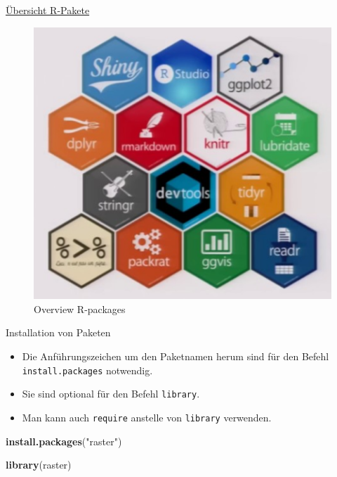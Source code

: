 \documentclass[ignorenonframetext,]{beamer}
\newenvironment{Shaded}{\begin{snugshade}}{\end{snugshade}}
\newcommand{\KeywordTok}[1]{\textcolor[rgb]{0.26,0.66,0.93}{\textbf{#1}}}
\newcommand{\StringTok}[1]{\textcolor[rgb]{0.02,0.61,0.04}{#1}}
\newcommand{\NormalTok}[1]{\textcolor[rgb]{0.74,0.68,0.62}{#1}}
\providecommand{\tightlist}{%
  \setlength{\itemsep}{0pt}\setlength{\parskip}{0pt}}
\begin{document}
\begin{frame}{\href{https://www.youtube.com/watch?v=kKI9--Opmso}{Übersicht
R-Pakete}}

\begin{figure}
\centering
\includegraphics{figure/packages_overview.PNG}
\caption{Overview R-packages}
\end{figure}

\end{frame}

\begin{frame}[fragile]{Installation von Paketen}

\begin{itemize}
\tightlist
\item
  Die Anführungszeichen um den Paketnamen herum sind für den Befehl
  \texttt{install.packages} notwendig.
\item
  Sie sind optional für den Befehl \texttt{library}.
\item
  Man kann auch \texttt{require} anstelle von \texttt{library}
  verwenden.
\end{itemize}

\begin{Shaded}
\begin{Highlighting}[]
\KeywordTok{install.packages}\NormalTok{(}\StringTok{"raster"}\NormalTok{)}

\KeywordTok{library}\NormalTok{(raster)}
\end{Highlighting}
\end{Shaded}

\end{frame}
\end{document}
